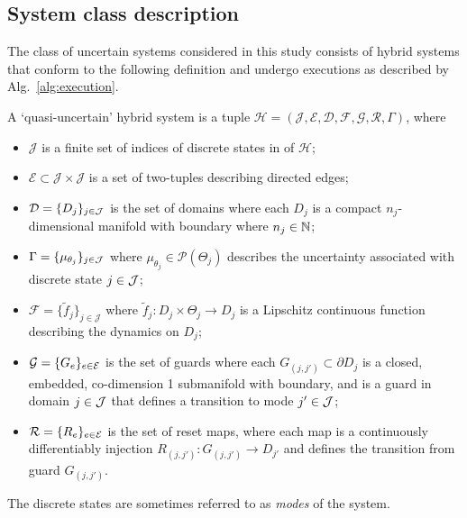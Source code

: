 \subsection{System class description}
  The class of uncertain systems considered in this study consists of hybrid systems that conform to the following definition and undergo executions as described by Alg.~\ref{alg:execution}.
\begin{defn}\label{def:system}
  A `quasi-uncertain' hybrid system is a tuple \mbox{$\mathcal H=(\mathcal J,\mathcal E,\mathcal D,\mathcal F,\mathcal G,\mathcal R,\Gamma)$}, where
  \begin{itemize}
    \item $\mathcal J$ is a finite set of indices of discrete states in of $\mathcal H$;
    \item $\mathcal E\subset \mathcal J\times \mathcal J$ is a set of two-tuples describing directed edges;
    \item $\mathcal D = \{D_j\}_{j \in {\cal J}}$ is the set of domains where each $D_j$ is a compact $n_j$-dimensional manifold with boundary where $n_j \in \mathbb{N}$;
    \item $\Gamma = \{\mu_{\theta_j} \}_{j \in {\cal J}}$ where $\mu_{\theta_j}\in \mathcal P(\Theta_j)$ describes the uncertainty associated with discrete state $j \in {\cal J}$;
    \item $\mathcal F=\{\tilde f_j\}_{j\in \mathcal J}$ where $\tilde{f}_j: D_j \times \Theta_j \to D_j$ is a Lipschitz continuous function describing the dynamics on $D_j$;
    \item $\mathcal G=\{G_e\}_{e \in {\cal E}}$ is the set of guards where each $G_{(j,j')} \subset \partial D_j$ is a closed, embedded, co-dimension 1 submanifold with boundary, and is a guard in domain $j \in {\cal J}$ that defines a transition to mode $j' \in {\cal J}$;
    \item $\mathcal R = \{R_e\}_{e \in {\cal E}}$ is the set of reset maps, where each map is a continuously differentiably injection $R_{(j,j')}: G_{(j,j')} \to D_{j'}$ and defines the transition from guard $G_{(j,j')}$.
  \end{itemize}
\end{defn}
\noindent The discrete states are sometimes referred to as {\em modes} of the system.

